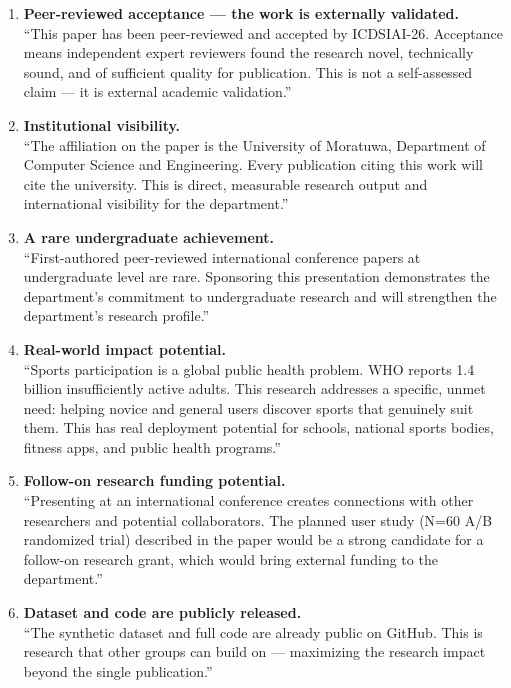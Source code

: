 \documentclass[12pt,a4paper]{article}
\begin{document}
\begin{enumerate}[leftmargin=*, label=\textbf{Arg \arabic{enumi}.}]

\item \textbf{Peer-reviewed acceptance --- the work is externally validated.}\\
``This paper has been peer-reviewed and accepted by ICDSIAI-26. Acceptance
means independent expert reviewers found the research novel, technically
sound, and of sufficient quality for publication. This is not a self-assessed
claim --- it is external academic validation.''

\item \textbf{Institutional visibility.}\\
``The affiliation on the paper is the University of Moratuwa, Department of
Computer Science and Engineering. Every publication citing this work will
cite the university. This is direct, measurable research output and
international visibility for the department.''

\item \textbf{A rare undergraduate achievement.}\\
``First-authored peer-reviewed international conference papers at
undergraduate level are rare. Sponsoring this presentation demonstrates the
department's commitment to undergraduate research and will strengthen the
department's research profile.''

\item \textbf{Real-world impact potential.}\\
``Sports participation is a global public health problem. WHO reports 1.4
billion insufficiently active adults. This research addresses a specific,
unmet need: helping novice and general users discover sports that genuinely
suit them. This has real deployment potential for schools, national sports
bodies, fitness apps, and public health programs.''

\item \textbf{Follow-on research funding potential.}\\
``Presenting at an international conference creates connections with other
researchers and potential collaborators. The planned user study (N=60 A/B
randomized trial) described in the paper would be a strong candidate for
a follow-on research grant, which would bring external funding to the
department.''

\item \textbf{Dataset and code are publicly released.}\\
``The synthetic dataset and full code are already public on GitHub. This is
research that other groups can build on --- maximizing the research impact
beyond the single publication.''

\end{enumerate}
\end{document}
